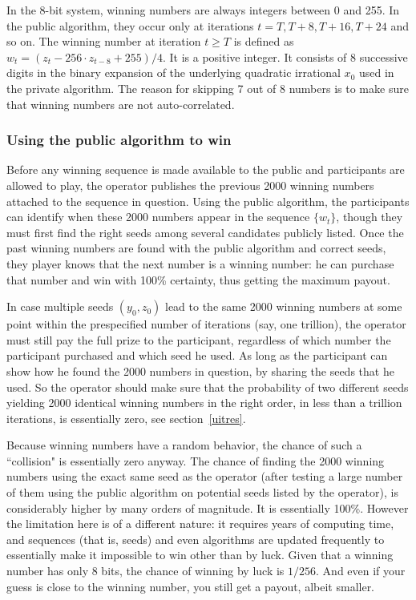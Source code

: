 \documentclass[oneside,10pt]{book}
\begin{document}
In the 8-bit system, winning numbers are always integers between 0 and 255. In the public algorithm, they occur only at iterations $t = T, T+8, T+16, T+24$ and so on. 
The winning number at iteration 
$t\geq T$ is defined as $w_t = (z_t - 256\cdot z_{t-8} + 255)/4$. It is a positive integer. It consists of 8 successive digits in the binary expansion of the underlying quadratic irrational $x_0$ used in the private algorithm.
The reason for skipping 7 out of 8 numbers is to make sure that winning numbers are not auto-correlated.

\subsubsection{Using the public algorithm to win}

Before any winning sequence is made available to the public and participants are allowed to play, the operator publishes the previous 2000 winning numbers  attached to the sequence in question. Using the public algorithm, the participants can identify when these 2000 numbers appear in the sequence $\{w_t\}$, though they must first find the right seeds among several candidates publicly listed. Once the past winning numbers are found with the public algorithm and correct seeds, they player knows that the next number is a winning number: he can purchase that number and win with 100\% certainty, thus getting the maximum payout. 

In case multiple seeds $(y_0, z_0)$ lead to the same 2000 winning numbers at some point within the prespecified number of iterations (say, one trillion), the operator must still pay the full prize to the participant, regardless of which number the participant purchased and which seed he used.  As long as the participant can show how he found the 2000 numbers in question, by sharing the seeds that he used. So the operator should make sure that
 the probability of two different seeds yielding 2000 identical winning numbers in the right order, in less than a trillion iterations, is essentially zero, see section~\ref{uitres}.    

Because winning numbers have a random behavior, the chance of such a ``collision" is essentially zero anyway. The chance of finding the 2000 winning numbers using the exact same seed as the operator (after testing a large number of them using the public algorithm on potential seeds listed by the operator),  is considerably higher by many orders of magnitude. It is 
 essentially 100\%. However the limitation here is of a different nature: it requires years of computing time, and sequences (that is, seeds) and even algorithms are updated frequently to essentially make it impossible to win other than by luck. Given that a winning number has only 8 bits, the chance of winning by luck is $1/256$.  And even if your guess is close to the winning number, you still get a payout, albeit smaller.
\end{document}
